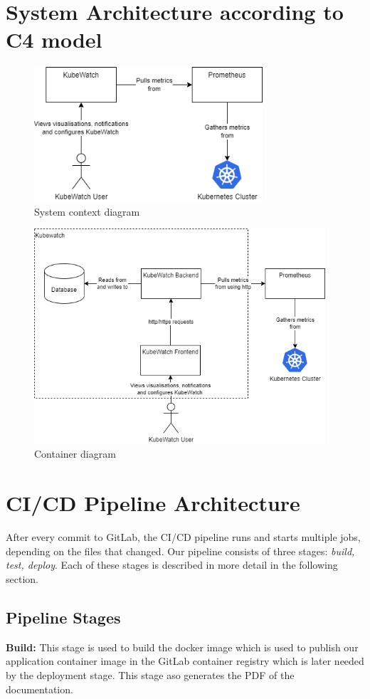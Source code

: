 \section{System Architecture according to C4 model}
\begin{figure}[H]
  \centering
  \includegraphics[height=5cm]{resources/System_context_diagram.png}
  \caption{System context diagram}
  \label{fig:system-context-diagram}
\end{figure}

\begin{figure}[H]
  \centering
  \includegraphics[height=8cm]{resources/Container_diagram.png}
  \caption{Container diagram}
  \label{fig:container-diagram}
\end{figure}

\pagebreak
\section{CI/CD Pipeline Architecture}
After every commit to GitLab, the CI/CD pipeline runs and starts multiple jobs, depending on the files that changed.
Our pipeline consists of three stages: \textit{build, test, deploy}. Each of these stages is described in more detail in the following section.

\subsection{Pipeline Stages}
\textbf{Build:} This stage is used to build the docker image which is used to publish our application container image
in the GitLab container registry which is later needed by the deployment stage.
This stage aso generates the PDF of the documentation.

